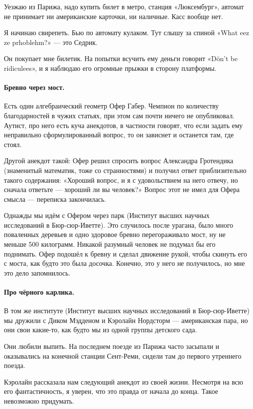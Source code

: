\documentclass{book}
\begin{document}
Уезжаю из Парижа, надо купить билет в метро, станция «Люксембург»,
автомат не принимает ни американские карточки, ни наличные.
Касс вообще нет.

Я начинаю свирепеть. 
Бью по автомату кулаком.
Тут слышу за спиной «What eez ze prhoblehm?» --- это Седрик.

Он покупает мне билетик.
На попытки всучить ему деньги говорит «D\"{o}n't be ridiculees», и я наблюдаю его огромные прыжки в сторону платформы.

\paragraph{Бревно через мост.}
Есть один алгебраический геометр Офер Габер.
Чемпион по количеству благодарностей в чужих статьях, при этом сам почти ничего не опубликовал.
Аутист, про него есть куча анекдотов, в частности говорят, что если задать ему неправильно сформулированный вопрос, то он зависнет и останется там, где стоял.

Другой анекдот такой: Офер решил спросить вопрос Александра Гротендика (знаменитый математик, тоже со странностями) и получил ответ приблизительно такого содержания: «Хороший вопрос, и я с удовольствием на него отвечу, но сначала ответьте --- хороший ли вы человек?»
Вопрос этот не имел для Офера смысла --- переписка закончилась.

Однажды мы идём с Офером через парк (Институт высших научных исследований в Бюр-сюр-Иветте).
Это случилось после урагана, было много поваленных деревьев и одно здоровое бревно перегораживало мост,
ну не меньше 500 килограмм.
Никакой разумный человек не подумал бы его поднимать.
Офер подошёл к бревну и сделал движение рукой, чтобы скинуть его с моста, как будто это была досочка.
Конечно, это у него не получилось, но мне это дело запомнилось.

\paragraph{Про чёрного карлика.}
В том же институте (Институт высших научных исследований в Бюр-сюр-Иветте) мы дружили с  
Диком Мэдденом и Кэролайн Нордсторм --- американская пара, но они свои какие-то, как будто мы из одной группы детского сада.

Они любили выпить.
На последнем поезде из Парижа часто засыпали и оказывались на конечной станции Сент-Реми, сидели там до первого утреннего поезда.

{\sloppy

Кэролайн рассказала нам следующий анекдот из своей жизни.
Несмотря на всю его фантастичность, я уверен, что это правда от начала до конца.
Такое невозможно придумать.

}
\end{document}
